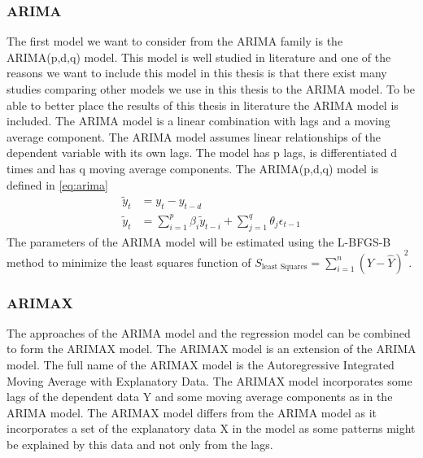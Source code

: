 \subsubsection{ARIMA}
\label{subsec:arima}
The first model we want to consider from the ARIMA family is the ARIMA(p,d,q) model. This model is well studied in literature and one of the reasons we want to include this model in this thesis is that there exist many studies comparing other models we use in this thesis to the ARIMA model. To be able to better place the results of this thesis in literature the ARIMA model is included. The ARIMA model is a linear combination with lags and a moving average component. The ARIMA model assumes linear relationships of the dependent variable with its own lags. The model has p lags, is differentiated d times and has q moving average components. The ARIMA(p,d,q) model is defined in \autoref{eq:arima}
\begin{equation}
\begin{split}
    \tilde{y}_t &= y_t - y_{t-d}\\
    \tilde{y}_t &= \sum\limits_{i=1}^p \beta_i \tilde{y}_{t-i}  + \sum\limits_{j=1}^q \theta_j \epsilon_{t-1}
\label{eq:arima}
\end{split}
\end{equation}
The parameters of the ARIMA model will be estimated using the L-BFGS-B method \citep{L-BFGS-B} to minimize the least squares function of $S_{\text{least Squares}} = \sum^n_{i=1} (Y - \hat{Y})^2$.

\subsubsection{ARIMAX}
\label{subsec:arimax}
The approaches of the ARIMA model and the regression model can be combined to form the ARIMAX model. The ARIMAX model is an extension of the ARIMA model. The full name of the ARIMAX model is the Autoregressive Integrated Moving Average with Explanatory Data. The ARIMAX model incorporates some lags of the dependent data Y and some moving average components as in the ARIMA model. The ARIMAX model differs from the ARIMA model as it incorporates a set of the explanatory data X in the model as some patterns might be explained by this data and not only from the lags.\\



